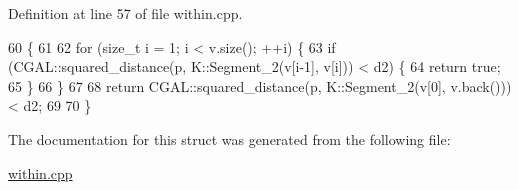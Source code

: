 Definition at line 57 of file within.\-cpp.


\begin{DoxyCode}
60         \{
61 
62             \textcolor{keywordflow}{for} (\textcolor{keywordtype}{size\_t} i = 1; i < v.size(); ++i) \{
63                 \textcolor{keywordflow}{if} (CGAL::squared\_distance(p, K::Segment\_2(v[i-1], v[i])) < d2) \{
64                     \textcolor{keywordflow}{return} \textcolor{keyword}{true};
65                 \}
66             \}
67 
68             \textcolor{keywordflow}{return} CGAL::squared\_distance(p, K::Segment\_2(v[0], v.back())) < d2;
69 
70         \}
\end{DoxyCode}


The documentation for this struct was generated from the following file\-:\begin{DoxyCompactItemize}
\item 
\hyperlink{within_8cpp}{within.\-cpp}\end{DoxyCompactItemize}
